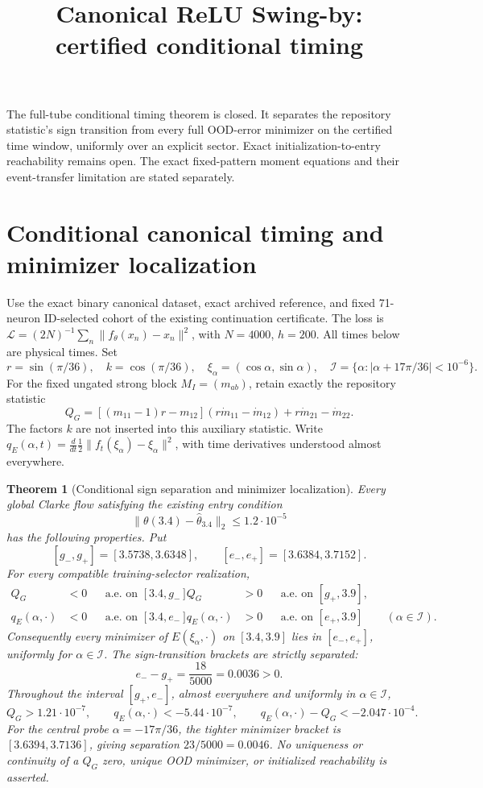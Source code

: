 \documentclass[10pt]{article}
\title{Canonical ReLU Swing-by: certified conditional timing}
\author{}\date{}
\newtheorem{theorem}{Theorem}[section]
\begin{document}
\maketitle
\noindent
The full-tube conditional timing theorem is closed. It separates the
repository statistic's sign transition from every full OOD-error minimizer
on the certified time window, uniformly over an explicit sector. Exact
initialization-to-entry reachability remains open. The exact fixed-pattern
moment equations and their event-transfer limitation are stated separately.
\section{Conditional canonical timing and minimizer localization}
\label{sec:canonical-full-tube-timing}
Use the exact binary canonical dataset, exact archived reference, and fixed
71-neuron ID-selected cohort of the existing continuation certificate.
The loss is $\mathcal L=(2N)^{-1}\sum_n\|f_\theta(x_n)-x_n\|^2$,
with $N=4000$, $h=200$. All times below are physical times. Set
\[
 r=\sin(\pi/36),\quad k=\cos(\pi/36),\quad
 \xi_\alpha=(\cos\alpha,\sin\alpha),\quad
 \mathcal I=\{\alpha:|\alpha+17\pi/36|<10^{-6}\}.
\]
For the fixed ungated strong block $M_I=(m_{ab})$, retain exactly the
repository statistic
\[
 Q_G=[(m_{11}-1)r-m_{12}](r\dot m_{11}-\dot m_{12})
           +r\dot m_{21}-\dot m_{22}.
\]
The factors $k$ are not inserted into this auxiliary statistic.
Write $q_E(\alpha,t)=\frac{d}{dt}\frac12\|f_t(\xi_\alpha)-\xi_\alpha\|^2$,
with time derivatives understood almost everywhere.

\begin{theorem}[Conditional sign separation and minimizer localization]
\label{thm:canonical-full-tube-timing}
Every global Clarke flow satisfying the existing entry condition
\[
 \|\theta(3.4)-\widehat\theta_{3.4}\|_2\le1.2\cdot10^{-5}
\]
has the following properties. Put
\[
 [g_-,g_+]=[3.5738,3.6348],\qquad
 [e_-,e_+]=[3.6384,3.7152].
\]
For every compatible training-selector realization,
\begin{align*}
 Q_G&<0&&\text{a.e. on }[3.4,g_-],&
 Q_G&>0&&\text{a.e. on }[g_+,3.9],\\
 q_E(\alpha,\cdot)&<0&&\text{a.e. on }[3.4,e_-],&
 q_E(\alpha,\cdot)&>0&&\text{a.e. on }[e_+,3.9]
 \qquad(\alpha\in\mathcal I).
\end{align*}
Consequently every minimizer of $E(\xi_\alpha,\cdot)$ on $[3.4,3.9]$
lies in $[e_-,e_+]$, uniformly for $\alpha\in\mathcal I$.
The sign-transition brackets are strictly separated:
\[
 e_- -g_+=\frac{18}{5000}=0.0036>0.
\]
Throughout the interval $[g_+,e_-]$, almost everywhere and uniformly in
$\alpha\in\mathcal I$,
\[
 Q_G>1.21\cdot10^{-7},\qquad
 q_E(\alpha,\cdot)<-5.44\cdot10^{-7},\qquad
 q_E(\alpha,\cdot)-Q_G<-2.047\cdot10^{-4}.
\]
For the central probe $\alpha=-17\pi/36$, the tighter minimizer bracket is
$[3.6394,3.7136]$, giving separation $23/5000=0.0046$.
No uniqueness or continuity of a $Q_G$ zero, unique OOD minimizer, or
initialized reachability is asserted.
\end{theorem}
\end{document}
